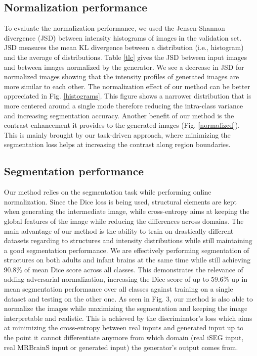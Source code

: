 \documentclass{article}
\begin{document}
\subsection{Normalization performance}

To evaluate the normalization performance, we used the Jensen-Shannon divergence (JSD) between intensity histograms of images in the validation set. JSD measures the mean KL divergence between a distribution (i.e., histogram) and the average of distributions. Table \ref{tlc} gives the JSD between input images and between images normalized by the generator. We see a decrease in JSD for normalized images showing that the intensity profiles of generated images are more similar to each other. The normalization effect of our method can be better appreciated in Fig. \ref{histograms}. This figure shows a narrower distribution that is more centered around a single mode therefore reducing the intra-class variance and increasing segmentation accuracy. Another benefit of our method is the contrast enhancement it provides to the generated images (Fig. \ref{normalized}). This is mainly brought by our task-driven approach, where minimizing the segmentation loss helps at increasing the contrast along region boundaries.

\subsection{Segmentation performance}

Our method relies on the segmentation task while performing online normalization. Since the Dice loss is being used, structural elements are kept when generating the intermediate image, while cross-entropy aims at keeping the global features of the image while reducing the differences across domains. The main advantage of our method is the ability to train on drastically different datasets regarding to structures and intensity distributions while still maintaining a good segmentation performance. We are effectively performing segmentation of structures on both adults and infant brains at the same time while still achieving 90.8\% of mean Dice score across all classes. This demonstrates the relevance of adding adversarial normalization, increasing the Dice score of up to 59.6\% up in mean segmentation performance over all classes against training on a single dataset and testing on the other one. As seen in Fig. 3, our method is also able to normalize the images while maximizing the segmentation and keeping the image interpretable and realistic. This is achieved by the discriminator's loss which aims at minimizing the cross-entropy between real inputs and generated input up to the point it cannot differentiate anymore from which domain (real iSEG input, real MRBrainS input or generated input) the generator's output comes from.
\end{document}
